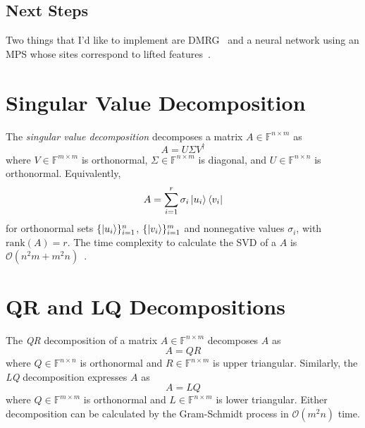 \documentclass[12pt]{article}
\begin{document}
\begin{multicols}{2}
	\subsection{Next Steps}
	Two things that I'd like to implement are DMRG~\cite{DMRG}
	and a neural network using an MPS whose sites correspond to lifted
	features~\cite{mps-ml, Huggins}.





\appendix
\section{Singular Value Decomposition}
The \textit{singular value decomposition} decomposes a matrix $A\in\mathds{F}^{n\times m}$ as
\[
	A=U\Sigma V^\dagger
\]
where $V\in \mathds{F}^{m\times m}$ is orthonormal, $\Sigma\in\mathds{F}^{n\times m}$ is diagonal, and $U\in\mathds{F}^{n\times n}$ is orthonormal. Equivalently,
\[
	A=\sum_{i=1}^r\sigma_i\ket{u_i}\bra{v_i}
\]
for orthonormal sets $\{\ket{u_i}\}_{i=1}^n$, $\{\ket{v_i}\}_{i=1}^m$ and nonnegative values $\sigma_i$, with $\text{rank}(A)=r$. The time complexity to calculate the SVD of a $A$ is $\mathcal{O}(n^2m+m^2n)$~\cite{matrix-stuff}.
\section{QR and LQ Decompositions}
The \textit{QR} decomposition of a matrix $A\in\mathds{F}^{n\times m}$ decomposes $A$ as
\[
	A=QR
\]
where $Q\in\mathds{F}^{n\times n}$ is orthonormal and $R\in\mathds{F}^{n\times m}$ is upper triangular. Similarly, the \textit{LQ} decomposition expresses $A$ as
\[
	A=LQ
\]
where $Q\in\mathds{F}^{m\times m}$ is orthonormal and $L\in\mathds{F}^{n\times m}$ is lower triangular.
Either decomposition can be calculated by the Gram-Schmidt process in $\mathcal{O}(m^2n)$ time.
\end{multicols}
\end{document}
